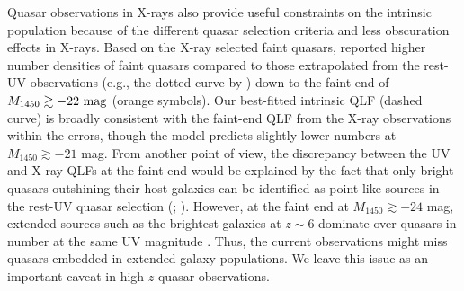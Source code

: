 \documentclass[twocolumn, twocolappendix]{aastex63}
\newcommand{\Muv}{M_{1450}}
\begin{document}
\begin{CJK*}{UTF8}{gbsn}
Quasar observations in X-rays also provide 
useful constraints on the intrinsic population because of the different quasar selection criteria and less obscuration effects in X-rays.
Based on the X-ray selected faint quasars, \cite{2015A&A...578A..83G,2019ApJ...884...19G} reported higher number densities of faint quasars
compared to those extrapolated from the rest-UV observations (e.g., the dotted curve by ) 
down to the faint end of $\Muv\gtrsim -22~{\rm mag}$ (orange symbols).
Our best-fitted intrinsic QLF (dashed curve) is broadly consistent with the faint-end QLF from the X-ray observations within the errors,
though the model predicts slightly lower numbers at $\Muv\gtrsim -21$ mag.
From another point of view, the discrepancy between the UV and X-ray QLFs at the faint end would be explained by the fact that 
only bright quasars outshining their host galaxies can be identified as point-like sources in the rest-UV quasar selection 
(; \citealt{2020MNRAS.495.2135N,2021MNRAS.502.2757O,2022arXiv220712282K}).
However, at the faint end at $\Muv\gtrsim -24$ mag, extended sources such as the brightest galaxies at $z\sim 6$ 
dominate over quasars in number at the same UV magnitude \citep{2022ApJS..259...20H}.
Thus, the current observations might miss quasars embedded in extended galaxy populations. 
We leave this issue as an important caveat in high-$z$ quasar observations.




\end{CJK*}
\end{document}
